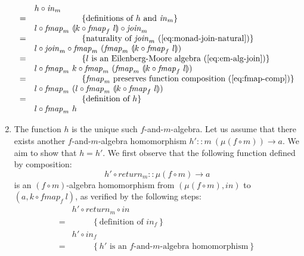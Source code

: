 \documentclass{jfp1}
\newcommand{\fold}[1]{\llparenthesis #1 \rrparenthesis}
\newcommand{\eqAnnotation}[1]{\hspace{2cm}\left\{\textrm{#1}\right\}}
\newcommand{\eqAnnotationS}[1]{\hspace{1cm}\left\{\textrm{#1}\right\}}
\begin{document}
\begin{proof*}
\begin{enumerate}
\begin{displaymath}
      \begin{array}{cl}
        & h \circ \mathit{in}_m \\
        =&\eqAnnotation{definitions of $h$ and $\mathit{in}_m$} \\
         &l \circ \mathit{fmap}_m~\fold{k \circ \mathit{fmap}_f~l} \circ \mathit{join}_m \\
        =&\eqAnnotation{naturality of $\mathit{join}_m$ (\autoref{eq:monad-join-natural})} \\
         &l \circ \mathit{join}_m \circ \mathit{fmap}_m~(\mathit{fmap}_m~\fold{k \circ \mathit{fmap}_f~l}) \\
        =&\eqAnnotation{$l$ is an Eilenberg-Moore algebra (\autoref{eq:em-alg-join})} \\
         &l \circ \mathit{fmap}_m~k \circ \mathit{fmap}_m~(\mathit{fmap}_m~\fold{k \circ \mathit{fmap}_f~l}) \\
        =&\eqAnnotation{$\mathit{fmap}_m$ preserves function composition (\autoref{eq:fmap-comp})} \\
         &l \circ \mathit{fmap}_m~(l \circ \mathit{fmap}_m~\fold{k \circ \mathit{fmap}_f~l}) \\
        =&\eqAnnotation{definition of $h$} \\
         &l \circ \mathit{fmap}_m~h
      \end{array}
    \end{displaymath}
  \item The function $h$ is the unique such $f$-and-$m$-algebra. Let
    us assume that there exists another $f$-and-$m$-algebra
    homomorphism $h' :: m~(\mu(f \circ m)) \to a$. We aim to show that
    $h = h'$. We first observe that the following function defined by composition:
    \begin{displaymath}
      h' \circ \mathit{return}_m :: \mu(f \circ m) \to a
    \end{displaymath}
    is an $(f \circ m)$-algebra homomorphism from $(\mu(f \circ m),
    \mathit{in})$ to $(a, k \circ \mathit{fmap}_f~l)$, as verified by
    the following steps:
    \begin{displaymath}
      \begin{array}{cl}
        & h' \circ \mathit{return}_m \circ \mathit{in} \\
        =&\eqAnnotationS{definition of $\mathit{in}_f$} \\
        & h' \circ \mathit{in}_f \\
        =&\eqAnnotationS{$h'$ is an $f$-and-$m$-algebra homomorphism} \\

\end{array}
\end{displaymath}
\end{enumerate}
\end{proof*}
\end{document}
